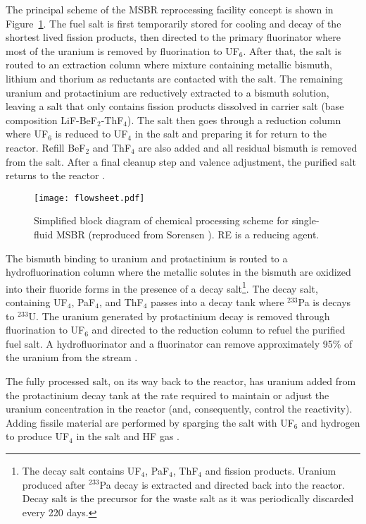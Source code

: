 The principal scheme of the \gls{MSBR} reprocessing facility concept is shown in Figure~\ref{fig:material_flow}. The fuel salt is first temporarily stored for cooling and decay of the shortest lived fission products, then directed to the primary fluorinator where most of the uranium is removed by fluorination to UF$_6$. After that, the salt is routed to an extraction column where mixture containing metallic bismuth, lithium and thorium as reductants are contacted with the salt. The remaining uranium and protactinium are reductively extracted to a bismuth solution, leaving a salt that only contains fission products dissolved in carrier salt (base composition LiF-BeF$_2$-ThF$_4$). The salt then goes through a reduction column where UF$_6$ is reduced to UF$_4$ in the salt and preparing it for return to the reactor. Refill BeF$_2$ and ThF$_4$ are also added and all residual bismuth is removed from the salt. After a final cleanup step and valence adjustment, the purified salt returns to the reactor \cite{carter_design_1972,sorensen_one-fluid_2006}.
\begin{figure}[htp!] %
  \centering
  \texttt{[image: flowsheet.pdf]}
  \caption{Simplified block diagram of chemical processing scheme for single-fluid \gls{MSBR} (reproduced 
  from Sorensen \cite{sorensen_one-fluid_2006}). RE is a reducing agent.}
  \label{fig:material_flow}
\end{figure}

The bismuth binding to uranium and protactinium is routed to a hydrofluorination column where the metallic solutes in the bismuth are oxidized into their fluoride forms in the presence of a decay salt\footnote{The decay salt contains UF$_4$, PaF$_4$, ThF$_4$ and fission products. Uranium produced after $^{233}$Pa decay is extracted and directed back into the reactor. Decay salt is the precursor for the waste salt as it was periodically discarded every 220 days.}. The decay salt, containing UF$_4$, PaF$_4$, and ThF$_4$ passes into a decay tank where $^{233}$Pa is decays to $^{233}$U. The uranium generated by protactinium decay is removed through fluorination to UF$_6$ and directed to the reduction column to refuel the purified fuel salt. A hydrofluorinator and a fluorinator can remove approximately 95\% of the uranium from the stream 
\cite{robertson_conceptual_1971}.

The fully processed salt, on its way back to the reactor, has uranium added from the protactinium decay tank at the rate required to maintain or adjust the uranium concentration in the reactor (and, consequently, control the reactivity). Adding fissile material are performed by sparging the salt with UF$_6$ and hydrogen to produce UF$_4$ in the salt and HF gas \cite{robertson_conceptual_1971}.

